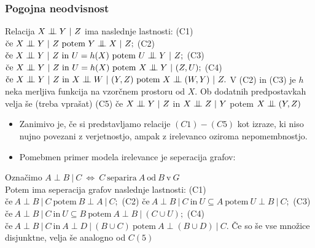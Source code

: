 \documentclass{beamer}
\newcommand{\cond}{\mathrel{\text{\scalebox{1.07}{$\perp\mkern-10mu\perp$}}}}
\begin{document}
\begin{frame}
    \frametitle{Pogojna neodvisnost}
        Relacija $ X \cond Y ~|~ Z$ ima naslednje lastnosti: \newline \newline
        (C1) $\text{če} ~X \cond Y ~|~ Z~ \text{potem}~ Y \cond X ~|~ Z;$\newline \newline
        (C2) $\text{če} ~X \cond Y ~|~ Z~ \text{in} ~U = h(X) ~\text{potem}~ U \cond Y ~|~ Z;$\newline \newline
        (C3) $\text{če} ~X \cond Y ~|~ Z~ \text{in} ~U = h(X) ~\text{potem}~ X \cond Y ~|~ (Z,U);$\newline \newline
        (C4) $\text{če} ~X \cond Y ~|~ Z~ \text{in} ~X \cond W ~|~ (Y,Z) ~\text{potem}~ X \cond (W,Y) ~|~ Z.$\newline \newline
        V (C2) in (C3) je $h$ neka merljiva funkcija na vzorčnem prostoru od $X$.
        Ob dodatnih predpostavkah velja še (treba vprašat) \newline \newline
        (C5) če $ X \cond Y ~|~ Z$ in $ X \cond Z ~|~ Y$ potem $ X \cond (Y,Z)$ 
\end{frame}
\begin{frame}
    \begin{itemize}
        \item Zanimivo je, če si predstavljamo relacije $(C1)-(C5)$ kot izraze,
        ki niso nujno povezani z verjetnostjo, ampak z irelevanco oziroma nepomembnostjo.
        \item Pomebmen primer modela irelevance je seperacija grafov:
    \end{itemize}
    Označimo $A \perp B ~|~ C ~ \Longleftrightarrow ~ C ~\text{separira}~ A~ \text{od} ~B~ \text{v}~ G$ \\
    Potem ima seperacija grafov naslednje lastnosti:\newline \newline
    (C1) $\text{če} ~A \perp B ~|~ C~ \text{potem}~ B \perp A ~|~ C;$\newline \newline
    (C2) $\text{če} ~A \perp B ~|~ C~ \text{in} ~U \subseteq A ~\text{potem}~ U \perp B ~|~ C;$\newline \newline
    (C3) $\text{če} ~A \perp B ~|~ C~ \text{in} ~U \subseteq B ~\text{potem}~ A \perp B ~|~ (C \cup U);$\newline \newline
    (C4) $\text{če} ~A \perp B ~|~ C~ \text{in} ~A \perp D ~|~ (B \cup C) ~\text{potem}~ A \perp (B \cup D) ~|~ C.$\newline \newline
    Če so še vse množice disjunktne, velja še analogno od $C(5)$ 
\end{frame}
\end{document}
